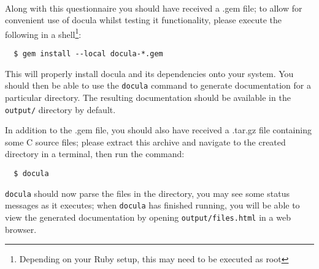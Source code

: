 \begin{Form}
  \medskip
  \TextField[name=currentsoftware,width=\longline,
    borderwidth=0,backgroundcolor={.85 .85 .85}]{}\\




  Along with this questionnaire you should have received a .gem file; to allow
  for convenient use of docula whilst testing it functionality, please execute
  the following in a shell\footnote{Depending on your Ruby setup, this may need
  to be executed as root}:
  \begin{verbatim}
  $ gem install --local docula-*.gem
  \end{verbatim}
  This will properly install docula and its dependencies onto your system. You
  should then be able to use the \verb|docula| command to generate documentation
  for a particular directory. The resulting documentation should be available in
  the \verb|output/| directory by default.

  In addition to the .gem file, you should also have received a .tar.gz file
  containing some C source files; please extract this archive and navigate to the
  created directory in a terminal, then run the command:
  \begin{verbatim}
  $ docula
  \end{verbatim}
  \verb|docula| should now parse the files in the directory, you may see some
  status messages as it executes; when \verb|docula| has finished running, you
  will be able to view the generated documentation by opening
  \verb|output/files.html| in a web browser.\\




\end{Form}
